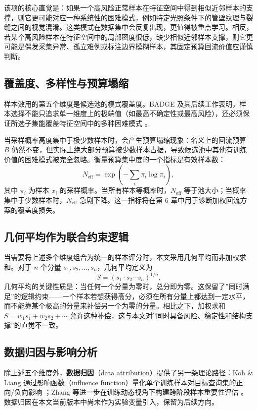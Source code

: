 \documentclass[UTF8,openany,12pt]{ctexbook}
\begin{document}
该项的核心直觉是：如果一个高风险正常样本在特征空间中得到相似近邻样本的支撑，则它更可能对应一种系统性的困难模式，例如特定光照条件下的管壁纹理与裂缝之间的视觉混淆。这类模式在数据集中会反复出现，更值得被重点学习。相反，若某个高风险样本在特征空间中的局部密度很低，缺少相似近邻样本支撑，则它更可能是偶发采集异常、孤立难例或标注边界模糊样本，其固定预算回流价值应谨慎判断。

\subsection{覆盖度、多样性与预算塌缩}
样本效用的第五个维度是候选池的模式覆盖度。BADGE 及其后续工作表明，样本选择不能只追求单一维度上的极端值（如最高不确定性或最高风险），还必须保证所选子集能覆盖特征空间中的多种困难模式 \cite{ash2020badge,yang2024plug}。

当采样概率高度集中于极少数样本时，会产生预算塌缩现象：名义上的回流预算 $B$ 仍然不变，但实际上绝大部分预算被少数样本占据，导致候选池中其他有训练价值的困难模式被完全忽略。衡量预算集中度的一个指标是有效样本数：
\begin{equation}
N_{\mathrm{eff}} = \exp\!\left(-\sum_{i} \pi_i \log \pi_i\right),
\end{equation}
其中 $\pi_i$ 为样本 $x_i$ 的采样概率。当所有样本等概率时，$N_{\mathrm{eff}}$ 等于池大小；当概率集中于少数样本时，$N_{\mathrm{eff}}$ 急剧下降。这一指标将在第 6 章中用于诊断加权回流方案的覆盖度损失。

\subsection{几何平均作为联合约束逻辑}
当需要将上述多个维度组合为统一的样本评分时，本文采用几何平均而非加权求和。对于 $n$ 个分量 $s_1, s_2, \dots, s_n$，几何平均定义为
\begin{equation}
S = (s_1 \cdot s_2 \cdots s_n)^{1/n}.
\end{equation}
几何平均的关键性质是：当任何一个分量为零时，总分即为零。这保留了”同时满足”的逻辑约束——一个样本若想获得高分，必须在所有分量上都达到一定水平，而不能靠某个极高的分量来补偿另一个为零的分量。相比之下，加权求和 $S = w_1 s_1 + w_2 s_2 + \cdots$ 允许这种补偿，这与本文对”同时具备风险、稳定性和结构支撑”的直觉不一致。

\subsection{数据归因与影响分析}
除上述五个维度外，\textbf{数据归因}（data attribution）提供了另一条理论路径：Koh \& Liang 通过影响函数（influence function）量化单个训练样本对目标查询集的正向/负向影响 \cite{koh2017influence}；Zhang 等进一步在训练动态视角下构建跨阶段样本重要性评估 \cite{zhang2024tdds}。数据归因在本文当前版本中尚未作为实验变量引入，保留为后续方向。
\end{document}
